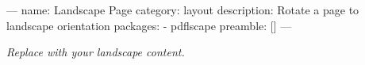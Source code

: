 ---
name: Landscape Page
category: layout
description: Rotate a page to landscape orientation
packages:
  - pdflscape
preamble: []
---
\begin{landscape}
\centering
\textit{Replace with your landscape content.}
\end{landscape}
